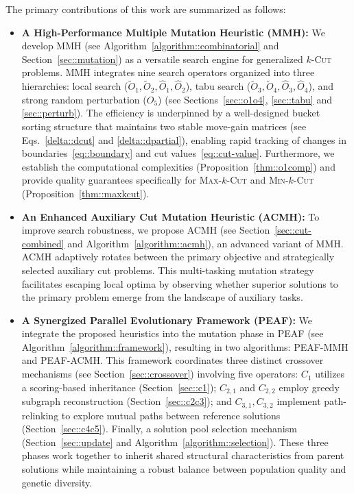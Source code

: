 \documentclass[12pt, a4paper]{article}%
\numberwithin{equation}{section}
\theoremstyle{plain}
\begin{document}
	
	The primary contributions of this work are summarized as follows:	
	\begin{itemize}
		\item \textbf{A High-Performance Multiple Mutation Heuristic (MMH):} We develop MMH (see Algorithm~\ref{algorithm::combinatorial} and Section~\ref{sec::mutation}) as a versatile search engine for generalized $k$-\textsc{Cut} problems. MMH integrates nine search operators organized into three hierarchies: local search ($\widetilde{O}_1, \widetilde{O}_2, \widehat{O}_1, \widehat{O}_2$), tabu search ($\widetilde{O}_3, \widetilde{O}_4, \widehat{O}_3, \widehat{O}_4$), and strong random perturbation ($O_5$) (see Sections~\ref{sec::o1o4}, \ref{sec::tabu} and \ref{sec::perturb}). The efficiency is underpinned by a well-designed bucket sorting structure that maintains two stable move-gain matrices (see Eqs.~\eqref{delta::dcut} and \eqref{delta::dpartial}), enabling rapid tracking of changes in boundaries~\eqref{eq::boundary} and cut values~\eqref{eq::cut-value}. Furthermore, we establish the computational complexities (Proposition~\ref{thm::o1comp}) and provide quality guarantees specifically for \textsc{Max}-$k$-\textsc{Cut} and \textsc{Min}-$k$-\textsc{Cut} (Proposition~\ref{thm::maxkcut}).		
		\item \textbf{An Enhanced Auxiliary Cut Mutation Heuristic (ACMH):} To improve search robustness, we propose ACMH (see Section~\ref{sec::cut-combined} and Algorithm~\ref{algorithm::acmh}), an advanced variant of MMH. ACMH adaptively rotates between the primary objective and strategically selected auxiliary cut problems. This multi-tasking mutation strategy facilitates escaping local optima by observing whether superior solutions to the primary problem emerge from the landscape of auxiliary tasks.		
		\item \textbf{A Synergized Parallel Evolutionary Framework (PEAF):} We integrate the proposed heuristics into the mutation phase in PEAF (see Algorithm~\ref{algorithm::framework}), resulting in two algorithms: PEAF-MMH and PEAF-ACMH. This framework coordinates three distinct crossover mechanisms (see Section~\ref{sec::crossover}) involving five operators: $C_1$ utilizes a scoring-based inheritance (Section~\ref{sec::c1}); $C_{2,1}$ and $C_{2,2}$ employ greedy subgraph reconstruction (Section~\ref{sec::c2c3}); and $C_{3,1}, C_{3,2}$ implement path-relinking to explore mutual paths between reference solutions (Section~\ref{sec::c4c5}). Finally, a solution pool selection mechanism (Section~\ref{sec::update} and Algorithm~\ref{algorithm::selection}). These three phases work together to inherit shared structural characteristics from parent solutions while maintaining a robust balance between population quality and genetic diversity.	

\end{itemize}
\end{document}
